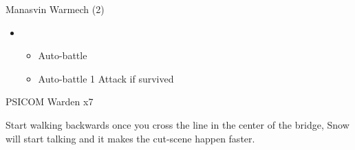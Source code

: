 \begin{paracol}{2}
\begin{battle}{Manasvin Warmech (2)}
\begin{itemize}
\begin{itemize}
			      \end{itemize}
			\item \third
			      \begin{itemize}
				      \item Auto-battle
				      \item Auto-battle 1 Attack if survived
			      \end{itemize}
		\end{itemize}
	\end{battle}
	\switchcolumn
	\begin{battle}{PSICOM Warden x7}
		 
	\end{battle}

	Start walking backwards once you cross the line in the center of the bridge, Snow will start talking and it makes the cut-scene happen faster.


\end{paracol}
